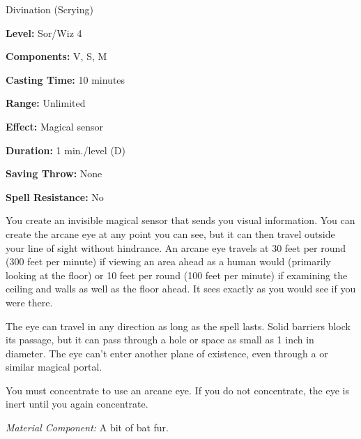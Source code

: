
Divination (Scrying)

\textbf{Level:} Sor/Wiz 4

\textbf{Components:} V, S, M

\textbf{Casting Time:} 10 minutes

\textbf{Range:} Unlimited

\textbf{Effect:} Magical sensor

\textbf{Duration:} 1 min./level (D)

\textbf{Saving Throw:} None

\textbf{Spell Resistance:} No

You create an invisible magical sensor that sends you visual information. You can 
create the arcane eye at any point you can see, but it can then travel 
outside your line of sight without hindrance. An arcane eye travels at 
30 feet per round (300 feet per minute) if viewing an area ahead as a human would 
(primarily looking at the floor) or 10 feet per round (100 feet per minute) if 
examining the ceiling and walls as well as the floor ahead. It sees exactly as 
you would see if you were there.

The eye can travel in any direction as long as the spell lasts. Solid barriers 
block its passage, but it can pass through a hole or space as small as 1 inch in 
diameter. The eye can't enter another plane of existence, even through a  
or similar magical portal.

You must concentrate to use an arcane eye. If you do not concentrate, 
the eye is inert until you again concentrate.

\textit{Material Component:} A bit of bat fur.

